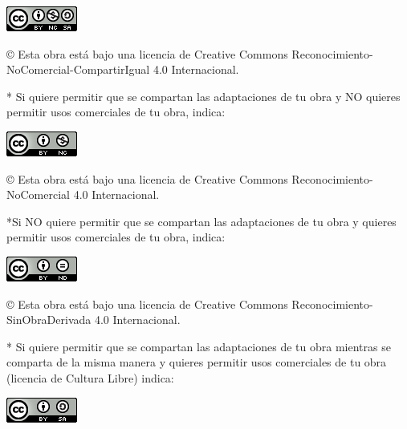 \documentclass[a4paper,12pt,oneside]{scrbook}
\begin{document}
\begin{center}
\includegraphics[scale=1.8]{images/by-nc-sa_88x31}\\[5mm]
\end{center}

\begin{large}
© Esta obra está bajo una licencia de Creative Commons Reconocimiento-NoComercial-CompartirIgual 4.0 Internacional.
\end{large}

\bigskip
\bigskip
\bigskip
* Si quiere permitir que se compartan las adaptaciones de tu obra y NO quieres permitir usos comerciales de tu obra, indica:

\begin{center}
\includegraphics[scale=1.8]{images/by-nc_88x31}\\[5mm]
\end{center}

\begin{large}
© Esta obra está bajo una licencia de Creative Commons Reconocimiento-NoComercial 4.0 Internacional.
\end{large}

\bigskip
\bigskip
\bigskip
*Si NO quiere permitir que se compartan las adaptaciones de tu obra y quieres permitir usos comerciales de tu obra, indica:

\begin{center}
\includegraphics[scale=1.8]{images/by-nd_88x31}\\[5mm]
\end{center}

\begin{large}
© Esta obra está bajo una licencia de Creative Commons Reconocimiento-SinObraDerivada 4.0 Internacional.
\end{large}

\bigskip
\bigskip
\bigskip
* Si quiere permitir que se compartan las adaptaciones de tu obra mientras se comparta de la misma manera y quieres permitir usos comerciales de tu obra (licencia de Cultura Libre) indica:

\begin{center}
\includegraphics[scale=1.8]{images/by-sa_88x31}\\[5mm]
\end{center}
\end{document}
